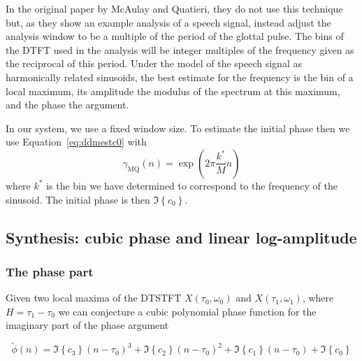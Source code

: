 In the original paper by McAulay and Quatieri, they do not use this technique
but, as they show an example analysis of a speech signal, instead adjust the
analysis window to be a multiple of the period of the glottal pulse. The bins of
the DTFT used in the analysis will be integer multiples of the frequency given
as the reciprocal of this period. Under the model of the speech signal as
harmonically related sinusoids, the best estimate for the frequency is the bin
of a local maximum, its amplitude the modulus of the spectrum at this maximum, and
the phase the argument.

In our system, we use a fixed window size. To estimate the initial phase then we use
Equation~\ref{eq:ddmestc0} with
\[
    \gamma_{\text{MQ}}(n)=\exp(2\pi\frac{k^{\ast}}{M}n)
\]
where $k^{\ast}$ is the bin we have determined to correspond to the frequency of
the sinusoid. The initial phase is then $\Im \left\{ c_{0} \right\}$.

\subsection{Synthesis: cubic phase and linear log-amplitude \label{sec:S13synthesis}}

\subsubsection{The phase part}

Given two local maxima of the
DTSTFT $X(\tau_0,\omega_0)$ and $X(\tau_1,\omega_1)$, where $H = \tau_1 -
\tau_0$ we can conjecture a cubic
polynomial phase function for the imaginary part of the phase argument

\[
    \tilde{\phi}(n) = \Im\left\{c_3\right\} (n-\tau_0)^3 + \Im\left\{c_2\right\} (n-\tau_0)^2 + \Im\left\{c_1\right\} (n-\tau_0) + \Im\left\{c_0\right\}
\]

